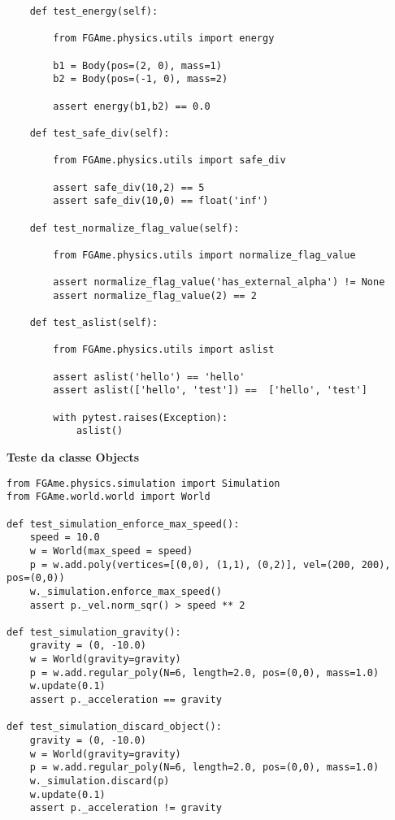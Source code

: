 \begin{anexosenv}
\begin{lstlisting}
    def test_energy(self):

        from FGAme.physics.utils import energy

        b1 = Body(pos=(2, 0), mass=1)
        b2 = Body(pos=(-1, 0), mass=2)

        assert energy(b1,b2) == 0.0

    def test_safe_div(self):

        from FGAme.physics.utils import safe_div

        assert safe_div(10,2) == 5
        assert safe_div(10,0) == float('inf')

    def test_normalize_flag_value(self):

        from FGAme.physics.utils import normalize_flag_value

        assert normalize_flag_value('has_external_alpha') != None
        assert normalize_flag_value(2) == 2

    def test_aslist(self):

        from FGAme.physics.utils import aslist

        assert aslist('hello') == 'hello'
        assert aslist(['hello', 'test']) ==  ['hello', 'test']

        with pytest.raises(Exception):
            aslist()
\end{lstlisting}



\end{anexosenv}



\textbf{Teste da classe Objects
}

\begin{lstlisting}
from FGAme.physics.simulation import Simulation
from FGAme.world.world import World

def test_simulation_enforce_max_speed():
    speed = 10.0
    w = World(max_speed = speed)
    p = w.add.poly(vertices=[(0,0), (1,1), (0,2)], vel=(200, 200), pos=(0,0))
    w._simulation.enforce_max_speed()
    assert p._vel.norm_sqr() > speed ** 2

def test_simulation_gravity():
    gravity = (0, -10.0)
    w = World(gravity=gravity)
    p = w.add.regular_poly(N=6, length=2.0, pos=(0,0), mass=1.0)
    w.update(0.1)
    assert p._acceleration == gravity

def test_simulation_discard_object():
    gravity = (0, -10.0)
    w = World(gravity=gravity)
    p = w.add.regular_poly(N=6, length=2.0, pos=(0,0), mass=1.0)
    w._simulation.discard(p)
    w.update(0.1)
    assert p._acceleration != gravity
\end{lstlisting}


